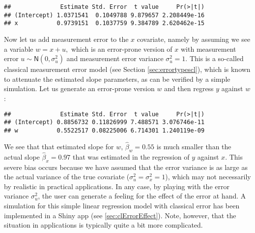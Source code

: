 \documentclass[]{book}
\newenvironment{Shaded}{\begin{snugshade}}{\end{snugshade}}
\newcommand{\KeywordTok}[1]{\textcolor[rgb]{0.13,0.29,0.53}{\textbf{#1}}}
\newcommand{\DecValTok}[1]{\textcolor[rgb]{0.00,0.00,0.81}{#1}}
\newcommand{\StringTok}[1]{\textcolor[rgb]{0.31,0.60,0.02}{#1}}
\newcommand{\OperatorTok}[1]{\textcolor[rgb]{0.81,0.36,0.00}{\textbf{#1}}}
\newcommand{\NormalTok}[1]{#1}
\theoremstyle{definition}
\theoremstyle{definition}
\theoremstyle{definition}
\theoremstyle{remark}
\begin{document}
\begin{Shaded}
\end{Shaded}

\begin{verbatim}
##              Estimate Std. Error  t value     Pr(>|t|)
## (Intercept) 1.0371541  0.1049788 9.879657 2.208449e-16
## x           0.9739151  0.1037759 9.384789 2.620462e-15
\end{verbatim}

Now let us add measurement error to the \(x\) covariate, namely by
assuming we see a variable \(w = x +u,\) which is an error-prone version
of \(x\) with measurement error \(u\sim\mathsf{N}(0,\sigma_u^2)\) and
measurement error variance \(\sigma_u^2=1\). This is a so-called
classical measurement error model (see Section \ref{sec:errortypescl}),
which is known to attenuate the estimated slope parameters, as can be
verified by a simple simulation. Let us generate an error-prone version
\(w\) and then regress \(y\) against \(w\):

\begin{Shaded}
\end{Shaded}

\begin{verbatim}
##              Estimate Std. Error  t value     Pr(>|t|)
## (Intercept) 0.8856732 0.11826999 7.488571 3.076746e-11
## w           0.5522517 0.08225006 6.714301 1.240119e-09
\end{verbatim}

We see that that estimated slope for \(w\), \(\hat\beta_w=0.55\) is much
smaller than the actual slope \(\hat\beta_x=0.97\) that was estimated in
the regression of \(y\) against \(x\). This severe bias occurs because
we have assumed that the error variance is as large as the actual
variance of the true covariate (\(\sigma_u^2=\sigma_x^2=1\)), which may
not necessarily by realistic in practical applications. In any case, by
playing with the error variance \(\sigma_u^2\), the user can generate a
feeling for the effect of the error at hand. A simulation for this
simple linear regression model with classical error has been implemented
in a Shiny app (see \ref{sec:clErrorEffect}). Note, however, that the
situation in applications is typically quite a bit more complicated.
\end{document}
